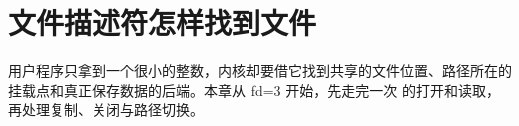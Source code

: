 \chapter{文件描述符怎样找到文件}

用户程序只拿到一个很小的整数，内核却要借它找到共享的文件位置、路径所在的
挂载点和真正保存数据的后端。本章从 fd=3 开始，先走完一次
 的打开和读取，再处理复制、关闭与路径切换。




